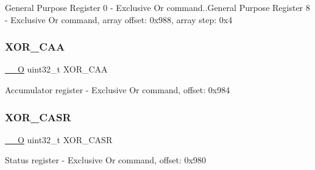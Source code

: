 General Purpose Register 0 -\/ Exclusive Or command..General Purpose Register 8 -\/ Exclusive Or command, array offset\+: 0x988, array step\+: 0x4 \mbox{\label{group___v_r_e_f___peripheral___access___layer_ga09f591ebc786dc021e32e4a25fc57cf2}} 
\subsubsection{\texorpdfstring{X\+O\+R\+\_\+\+C\+AA}{XOR\_CAA}}
{\footnotesize\ttfamily \mbox{\hyperlink{core__cm4_8h_a7e25d9380f9ef903923964322e71f2f6}{\+\_\+\+\_\+O}} uint32\+\_\+t X\+O\+R\+\_\+\+C\+AA}

Accumulator register -\/ Exclusive Or command, offset\+: 0x984 \mbox{\label{group___v_r_e_f___peripheral___access___layer_ga58630299543ab6cbaee0e57351cabb8e}} 
\subsubsection{\texorpdfstring{X\+O\+R\+\_\+\+C\+A\+SR}{XOR\_CASR}}
{\footnotesize\ttfamily \mbox{\hyperlink{core__cm4_8h_a7e25d9380f9ef903923964322e71f2f6}{\+\_\+\+\_\+O}} uint32\+\_\+t X\+O\+R\+\_\+\+C\+A\+SR}

Status register -\/ Exclusive Or command, offset\+: 0x980 